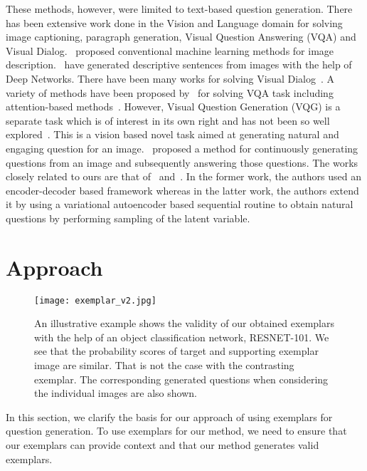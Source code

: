 \documentclass[11pt,a4paper]{article}
\begin{document}
These methods, however, were limited to text-based question generation. There has been extensive work done in the Vision and Language domain for solving image captioning, paragraph generation, Visual Question Answering (VQA) and Visual Dialog.~\cite{Barnard_JMLR2003,Farhadi_ECCV2010,Kulkarni_CVPR2011} proposed conventional machine learning methods for image description.~\cite{Socher_TACL2014,Vinyals_CVPR2015,Karpathy_CVPR2015,Xu_ICML2015,Fang_CVPR2015,Chen_CVPR2015,Johnson_CVPR2016,Yan_ECCV2016} have generated descriptive sentences from images with the help of Deep Networks.
There have been many works for solving Visual Dialog~\cite{chappell_HFES2004,Das_EMNLP2016,visdial,de2017guesswhat,strub2017end}. 
A variety of methods have been proposed by~\cite{Malinowski_NIPS2014,Lin_ECCV2014,VQA,Ren_NIPS2015,Ma_AAAI2016,Noh_CVPR2016} for solving VQA task including attention-based methods~\cite{Zhu_CVPR2016,Fukui_arXiv2016,Gao_NIPS2015,Xu_ECCV2016,Lu_NIPS2016,Shih_CVPR2016,Patro_CVPR2018}.
However, Visual Question Generation (VQG) is a separate task which is of interest in its own right and has not been so well explored~\cite{mostafazadeh2016generating}. This is a vision based novel task aimed at generating natural and engaging question for an image.~\cite{Yang_arXiv2015} proposed a method for continuously generating questions from an image and subsequently answering those questions.
The works closely related to ours are that of~\cite{mostafazadeh2016generating} and~\cite{jain2017creativity}. In the former work, the authors used an encoder-decoder based framework whereas in the latter work,
the authors extend it by using a variational autoencoder based sequential routine to obtain natural questions by performing sampling of the latent variable.
    
    
\section{Approach}
\begin{figure}[ht]
\centering
\texttt{[image: exemplar\_v2.jpg]}
\vspace{-0.7cm}
\caption{An illustrative example shows the validity of our obtained exemplars with the help of an object classification network, RESNET-101. We see that the probability scores of target and supporting exemplar image are similar. That is not the case with the contrasting exemplar. The corresponding generated questions when considering the individual images 
are also shown.  }
\label{fig:exemplar}
\end{figure} 
\noindent In this section, we clarify the basis for our approach of using exemplars for question generation. To use exemplars for our method, we need to ensure that our exemplars can provide context and that our method generates valid exemplars. 
\end{document}
